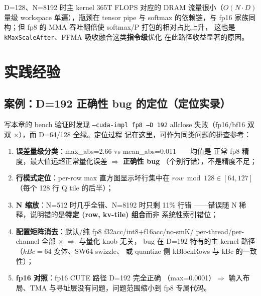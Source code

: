 D=128、N=8192 时主 kernel 365T FLOPS 对应的 DRAM 流量很小（$O(N\cdot D)$
量级 workspace 单遍），瓶颈在 tensor pipe 与 softmax 的依赖链，与
fp16 家族同构；但 fp8 的 MMA 吞吐翻倍使 softmax/P 打包的相对占比上升，
这也是 \texttt{kMaxScaleAfter}、FFMA 吸收融合这类\textbf{指令级}优化
在此路径收益显著的原因。

\section{实践经验}

\subsection{案例：D=192 正确性 bug 的定位（定位实录）}\label{sec:29-d192}

写本章的 bench 验证时发现 \texttt{--cuda-impl fp8 --D 192}
allclose 失败（fp16/bf16 双双 $\times$），而 D=64/128 全绿。定位过程
记在这里，可作为同类问题的排查参考：
\begin{enumerate}[itemsep=1pt,topsep=2pt]
  \item \textbf{误差量级分类}：max\_abs=2.66 vs mean\_abs=0.011——均值是
        正常 fp8 精度，最大值远超正常量化误差 $\Rightarrow$ \textbf{正确性 bug}
        （个别行错），不是精度不足；
  \item \textbf{行模式定位}：per-row max 直方图显示坏行集中在
        $row\bmod128\in[64,127]$（每个 128 行 Q tile 的后半）；
  \item \textbf{N 缩放}：N=512 时几乎全错、N=8192 时只剩 11\% 行错
        ——错误随 N 稀释，说明错的是\textbf{特定 (row, kv-tile) 组合}而非
        系统性索引错位；
  \item \textbf{配置矩阵消去}：默认/纯 fp8 f32acc/int8+f16acc/no-smK/
        per-thread/per-channel 全部 $\times$ $\Rightarrow$ 与量化 knob 无关，
        bug 在 D=192 特有的主 kernel 路径（$kBc{=}64$ 变体、SW64 swizzle、
        或 quantize 侧 kBlockRows 与 kBc 的一致性）；
  \item \textbf{fp16 对照}：fp16 CUTE 路径 D=192 完全正确
        （max=0.0001）$\Rightarrow$ 输入布局、TMA 与寻址层没有问题，问题范围缩小到
        fp8 专属代码。
\end{enumerate}

